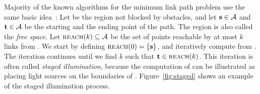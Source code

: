 \documentclass[english,gradu]{tktltiki2018}
\begin{document}
Majority of the known algorithms for the minimum link path problem use the same basic idea~\cite[Sections 26.4, 27.3]{handbook}:
Let \fspace be the region not blocked by obstacles, and let $\textbf{s}\in\mathcal{A}$ and $\textbf{t}\in\mathcal{A}$ be the starting and the ending point of the path.
The region \fspace is also called the \emph{free space}.
Let $\textsc{reach}(k)\subseteq\mathcal{A}$ be the set of points reachable by at most $k$ links from \spt.
We start by defining $\textsc{reach}(0)=\left\{\textbf{s}\right\}$, and iteratively compute  from .
The iteration continues until we find $k$ such that $\textbf{t}\in\textsc{reach}(k)$.
This iteration is often called \emph{staged illumination}, because the computation of  can be illustrated as placing light sources on the boundaries of .
Figure~\ref{fig:staged} shows an example of the staged illumination process.
\end{document}
